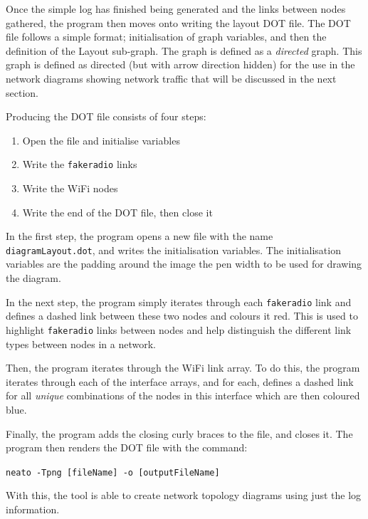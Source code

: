 Once the simple log has finished being generated and the links between nodes gathered, the program then moves onto writing the layout DOT file.
The DOT file follows a simple format; initialisation of graph variables, and then the definition of the Layout sub-graph.
The graph is defined as a \emph{directed} graph.
This graph is defined as directed (but with arrow direction hidden) for the use in the network diagrams showing network traffic that will be discussed in the next section.

Producing the DOT file consists of four steps:
\begin{enumerate}
    \item Open the file and initialise variables
    \item Write the \texttt{fakeradio} links
    \item Write the WiFi nodes
    \item Write the end of the DOT file, then close it
\end{enumerate}

In the first step, the program opens a new file with the name \texttt{diagramLayout.dot}, and writes the initialisation variables.
The initialisation variables are the padding around the image the pen width to be used for drawing the diagram.

In the next step, the program simply iterates through each \texttt{fakeradio} link and defines a dashed link between these two nodes and colours it red.
This is used to highlight \texttt{fakeradio} links between nodes and help distinguish the different link types between nodes in a network.


Then, the program iterates through the WiFi link array. 
To do this, the program iterates through each of the interface arrays, and for each, defines a dashed link for all \emph{unique} combinations of the nodes in this interface which are then coloured blue.

Finally, the program adds the closing curly braces to the file, and closes it.
The program then renders the DOT file with the command:

\texttt{neato -Tpng [fileName] -o [outputFileName]}

With this, the tool is able to create network topology diagrams using just the log information.

